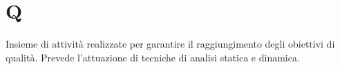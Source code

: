 
\section{Q}

Insieme di attività realizzate per garantire il raggiungimento degli obiettivi di qualità. Prevede l'attuazione di tecniche di analisi statica e dinamica.